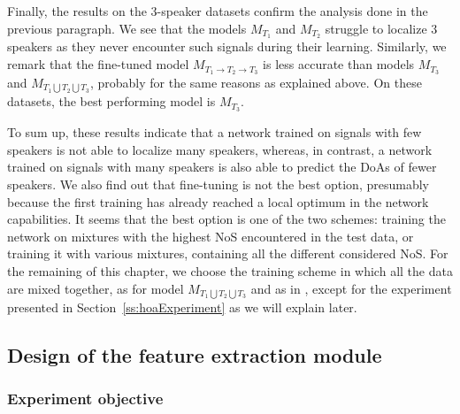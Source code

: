 Finally, the results on the $3$-speaker datasets confirm the analysis done in the previous paragraph. We see that the models $M_{T_1}$ and $M_{T_2}$ struggle to localize $3$ speakers as they never encounter such signals during their learning. Similarly, we remark that the fine-tuned model $M_{T_1 \rightarrow T_2 \rightarrow T_3}$ is less accurate than models $M_{T_3}$ and $M_{T_1 \bigcup T_2 \bigcup T_3}$, probably for the same reasons as explained above. On these datasets, the best performing model is $M_{T_3}$.

To sum up, these results indicate that a network trained on signals with few speakers is not able to localize many speakers, whereas, in contrast, a network trained on signals with many speakers is also able to predict the DoAs of fewer speakers. We also find out that fine-tuning is not the best option, presumably because the first training has already reached a local optimum in the network capabilities. It seems that the best option is one of the two schemes: training the network on mixtures with the highest NoS encountered in the test data, or training it with various mixtures, containing all the different considered NoS. For the remaining of this chapter, we choose the training scheme in which all the data are mixed together, as for model $M_{T_1 \bigcup T_2 \bigcup T_3}$ and as in \cite{perotin_crnn-based_2019}, except for the experiment presented in Section~\ref{ss:hoaExperiment} as we will explain later.

\subsection{Design of the feature extraction module}
\label{ss:multiLocalizationfeatureExtractionModule}

\subsubsection{Experiment objective}

